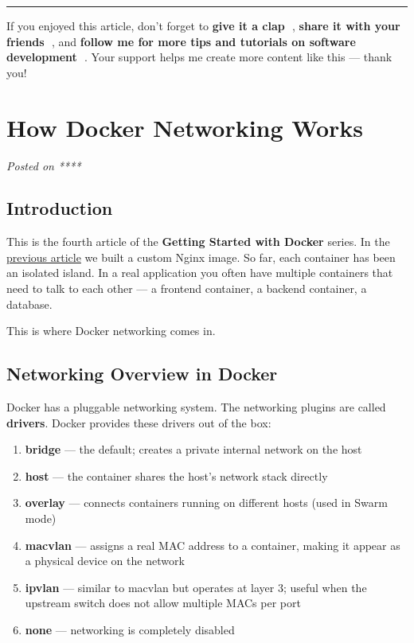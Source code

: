 \documentclass[11pt,american,a4paper,openany]{book}
\providecommand{\tightlist}{%
  \setlength{\itemsep}{2pt}\setlength{\parskip}{0pt}}
\begin{document}
\begin{center}\rule{0.5\linewidth}{0.5pt}\end{center}

If you enjoyed this article, don't forget to \textbf{give it a clap 👏},
\textbf{share it with your friends 🔗}, and \textbf{follow me for more
tips and tutorials on software development 📘}. Your support helps me
create more content like this --- thank you! 🙌

\section{How Docker Networking Works}\label{how-docker-networking-works}

\emph{Posted on ****}

\subsection{Introduction}\label{introduction-3}

This is the fourth article of the \textbf{Getting Started with Docker}
series. In the
\href{/Users/sasadangelo/github.com/sasadangelo/code4projects/dockerfile-and-building-custom-images/}{previous
article} we built a custom Nginx image. So far, each container has been
an isolated island. In a real application you often have multiple
containers that need to talk to each other --- a frontend container, a
backend container, a database.

This is where Docker networking comes in.

\subsection{Networking Overview in
Docker}\label{networking-overview-in-docker}

Docker has a pluggable networking system. The networking plugins are
called \textbf{drivers}. Docker provides these drivers out of the box:

\begin{enumerate}
\def\labelenumi{\arabic{enumi}.}
\tightlist
\item
  \textbf{bridge} --- the default; creates a private internal network on
  the host
\item
  \textbf{host} --- the container shares the host's network stack
  directly
\item
  \textbf{overlay} --- connects containers running on different hosts
  (used in Swarm mode)
\item
  \textbf{macvlan} --- assigns a real MAC address to a container, making
  it appear as a physical device on the network
\item
  \textbf{ipvlan} --- similar to macvlan but operates at layer 3; useful
  when the upstream switch does not allow multiple MACs per port
\item
  \textbf{none} --- networking is completely disabled
\end{enumerate}
\end{document}
